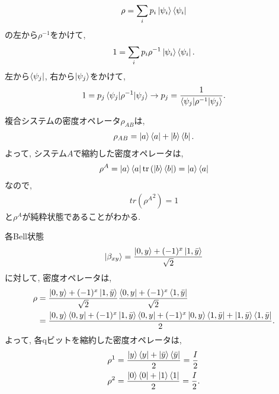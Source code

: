 \begin{ex}
    \begin{align*}
        \rho = \sum_{i} p_i \ket{\psi_i} \bra{\psi_i}
    \end{align*}
    の左から$\rho^{-1}$をかけて,
    \begin{align*}
        1 = \sum_{i} p_i \rho^{-1} \ket{\psi_i} \bra{\psi_i}.
    \end{align*}
    左から$\bra{\psi_j}$, 右から$\ket{\psi_j}$をかけて,
    \begin{align*}
        1 = p_j \braket{\psi_j|\rho^{-1}|\psi_j} \to p_j = \frac{1}{\braket{\psi_j|\rho^{-1}|\psi_j}}.
    \end{align*}
\end{ex}

\begin{ex}
    \label{ex2.74}
    複合システムの密度オペレータ$\rho_{AB}$は,
    \begin{align*}
        \rho_{AB} = \ket{a} \bra{a} + \ket{b} \bra{b}.
    \end{align*}
    よって, システム$A$で縮約した密度オペレータは,
    \begin{align*}
        \rho^A = \ket{a} \bra{a} \mathrm{tr}\left(\ket{b} \bra{b}\right) = \ket{a} \bra{a}
    \end{align*}
    なので,
    \begin{align*}
        tr\left({\rho^{A}}^2\right) = 1
    \end{align*}
    と$\rho^A$が純粋状態であることがわかる.
\end{ex}

\begin{ex}
    \label{ex2.75}
    各Bell状態
    \begin{align*}
        \ket{\beta_{xy}} = \frac{\ket{0,y}+ (-1)^x\ket{1,\bar{y}}}{\sqrt{2}}
    \end{align*}
    に対して, 密度オペレータは,
    \begin{align*}
        \rho
         & =
        \frac{\ket{0,y}+ (-1)^x\ket{1,\bar{y}}}{\sqrt{2}}
        \frac{\bra{0,y}+ (-1)^x\bra{1,\bar{y}}}{\sqrt{2}} \\
         & =
        \frac{
            \ket{0,y}\bra{0,y} + (-1)^x\ket{1,\bar{y}}\bra{0,y}
            +
            (-1)^x\ket{0,y}\bra{1,\bar{y}} + \ket{1,\bar{y}}\bra{1,\bar{y}}
        }{2}.
    \end{align*}
    よって, 各qビットを縮約した密度オペレータは,
    \begin{align*}
        \rho^1 & = \frac{\ket{y}\bra{y}  + \ket{\bar{y}}\bra{\bar{y}} }{2} = \frac{I}{2} \\
        \rho^2 & = \frac{ \ket{0}\bra{0} +  \ket{1}\bra{1}}{2} = \frac{I}{2}.
    \end{align*}
\end{ex}

